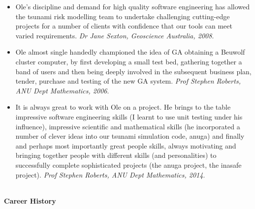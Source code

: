 \documentclass[11pt,a4paper]{article}
\begin{document}
\begin{itemize}
  \item Ole’s discipline and demand for high quality software engineering has allowed the tsunami risk modelling team to undertake challenging cutting-edge projects for a number of clients with confidence that our tools can meet varied requirements. \emph{Dr Jane Sexton, Geoscience Australia, 2008}.
  \item Ole almost single handedly championed the idea of GA obtaining a Beuwolf cluster computer, by first developing a small test bed, gathering together a band of users and then being deeply involved in the subsequent business plan, tender, purchase and testing of the new GA system. \emph{Prof Stephen Roberts, ANU Dept Mathematics, 2006}.
  \item It is always great to work with Ole on a project. He brings to the table impressive software engineering skills (I learnt to use unit testing under his influence), impressive scientific and mathematical skills (he incorporated a number of clever ideas into our tsunami simulation code, anuga) and finally and perhaps most importantly great people skills, always motivating and bringing together people with different skills (and personalities) to successfully complete sophisticated projects (the anuga project, the inasafe project). \emph{Prof Stephen Roberts, ANU Dept Mathematics, 2014}.
\end{itemize}

\begin{center}
  \hrulefill \\
  {\bf Career History} \\[-0.2cm]
  \hrulefill
\end{center}
\end{document}
